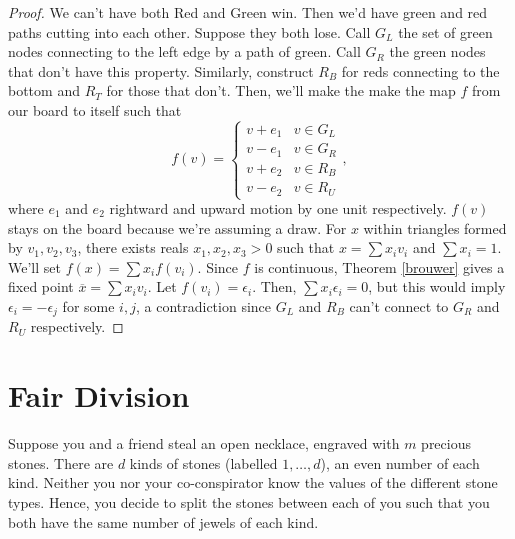 \documentclass[12pt]{amsart}
\theoremstyle{definition}
\begin{document}
    \begin{proof}
        We can't have both Red and Green win. Then we'd have green and red paths cutting into each other. Suppose they both lose. Call $G_L$ the set of green nodes connecting to the left edge by a path of green. Call $G_R$ the green nodes that don't have this property. Similarly, construct $R_B$ for reds connecting to the bottom and $R_T$ for those that don't. Then, we'll make the make the map $f$ from our board to itself such that $$f(v) = \begin{cases} v + e_1 & v \in G_L\\ v - e_1 & v \in G_R\\ v + e_2 & v \in R_B\\ v -e_2 & v \in R_U\end{cases},$$ where $e_1$ and $e_2$ rightward and upward motion by one unit respectively. $f(v)$ stays on the board because we're assuming a draw. For $x$ within triangles formed by $v_1,v_2,v_3$, there exists reals $x_1,x_2,x_3 > 0$ such that $x = \sum x_i v_i$ and $\sum x_i = 1$. We'll set $f(x) = \sum x_i f(v_i)$. Since $f$ is continuous, Theorem \ref{brouwer} gives a fixed point $\overline{x} = \sum x_iv_i$. Let $f(v_i) = \epsilon_i$. Then, $\sum x_i \epsilon_i = 0$, but this would imply $\epsilon_i = -\epsilon_j$ for some $i,j$, a contradiction since $G_L$ and $R_B$ can't connect to $G_R$ and $R_U$ respectively.
    \end{proof}

    \section{Fair Division}

    Suppose you and a friend steal an open necklace, engraved with $m$ precious stones. There are $d$ kinds of stones (labelled $1,\ldots,d$), an even number of each kind. Neither you nor your co-conspirator know the values of the different stone types. Hence, you decide to split the stones between each of you such that you both have the same number of jewels of each kind. 
\end{document}
